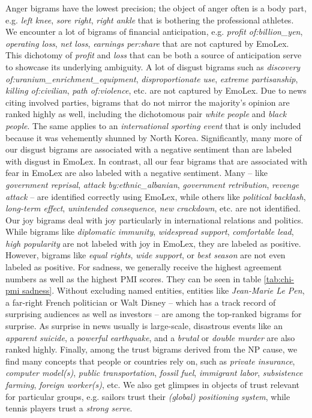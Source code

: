 Anger bigrams have the lowest precision; the object of anger often is a body part, e.g. \textit{left knee}, \textit{sore right}, \textit{right ankle} that is bothering the professional athletes. We encounter a lot of bigrams of financial anticipation, e.g. \textit{profit of:billion\_yen}, \textit{operating loss}, \textit{net loss}, \textit{earnings per:share} that are not captured by EmoLex. This dichotomy of \textit{profit} and \textit{loss} that can be both a source of anticipation serve to showcase its underlying ambiguity.
A lot of disgust bigrams such as \textit{discovery of:uranium\_enrichment\_equipment}, \textit{disproportionate use}, \textit{extreme partisanship}, \textit{killing of:civilian}, \textit{path of:violence}, etc. are not captured by EmoLex. Due to news citing involved parties, bigrams that do not mirror the majority's opinion are ranked highly as well, including the dichotomous pair \textit{white people} and \textit{black people}. The same applies to an \textit{international sporting event} that is only included because it was vehemently shunned by North Korea. Significantly, many more of our disgust bigrams are associated with a negative sentiment than are labeled with disgust in EmoLex.
In contrast, all our fear bigrams that are associated with fear in EmoLex are also labeled with a negative sentiment. Many -- like \textit{government reprisal}, \textit{attack by:ethnic\_albanian}, \textit{government retribution}, \textit{revenge attack} -- are identified correctly using EmoLex, while others like \textit{political backlash}, \textit{long-term effect}, \textit{unintended consequence}, \textit{new crackdown}, etc. are not identified.
Our joy bigrams deal with joy particularly in international relations and politics. While bigrams like \textit{diplomatic immunity}, \textit{widespread support}, \textit{comfortable lead}, \textit{high popularity} are not labeled with joy in EmoLex, they are labeled as positive. However, bigrams like \textit{equal rights}, \textit{wide support}, or \textit{best season} are not even labeled as positive.
For sadness, we generally receive the highest agreement numbers as well as the highest PMI scores. They can be seen in table \ref{tab:chi-pmi sadness}.
Without excluding named entities, entities like \textit{Jean-Marie Le Pen}, a far-right French politician or Walt Disney -- which has a track record of surprising audiences as well as investors -- are among the top-ranked bigrams for surprise. As surprise in news usually is large-scale, disastrous events like an \textit{apparent suicide}, a \textit{powerful earthquake}, and a \textit{brutal} or \textit{double murder} are also ranked highly.
Finally, among the trust bigrams derived from the NP cause, we find many concepts that people or countries rely on, such as \textit{private insurance}, \textit{computer model(s)}, \textit{public transportation}, \textit{fossil fuel}, \textit{immigrant labor}, \textit{subsistence farming}, \textit{foreign worker(s)}, etc. We also get glimpses in objects of trust relevant for particular groups, e.g. sailors trust their \textit{(global) positioning system}, while tennis players trust a \textit{strong serve}.

